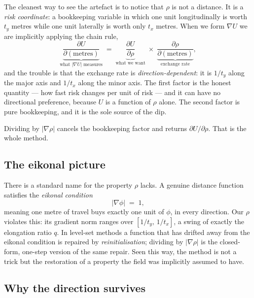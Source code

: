 \documentclass[11pt]{article}
\theoremstyle{remark}
\begin{document}
The cleanest way to see the artefact is to notice that $\rho$ is not a
distance. It is a \emph{risk coordinate}: a bookkeeping variable in which
one unit longitudinally is worth $t_y$ metres while one unit laterally is
worth only $t_x$ metres. When we form $\nabla U$ we are implicitly applying
the chain rule,
\begin{equation}
  \underbrace{\frac{\partial U}{\partial(\text{metres})}}_{\text{what }|\nabla U|\text{ measures}}
  \;=\;
  \underbrace{\frac{\partial U}{\partial\rho}}_{\text{what we want}}
  \;\times\;
  \underbrace{\frac{\partial\rho}{\partial(\text{metres})}}_{\text{exchange rate}} ,
\end{equation}
and the trouble is that the exchange rate is \emph{direction-dependent}: it
is $1/t_y$ along the major axis and $1/t_x$ along the minor axis. The first
factor is the honest quantity --- how fast risk changes per unit of risk ---
and it can have no directional preference, because $U$ is a function of
$\rho$ alone. The second factor is pure bookkeeping, and it is the sole
source of the dip.

Dividing by $|\nabla\rho|$ cancels the bookkeeping factor and returns
$\partial U/\partial\rho$. That is the whole method.

\subsection{The eikonal picture}

There is a standard name for the property $\rho$ lacks. A genuine distance
function satisfies the \emph{eikonal condition}
\begin{equation}
  \bigl|\nabla\phi\bigr| \;=\; 1 ,
\end{equation}
meaning one metre of travel buys exactly one unit of $\phi$, in every
direction. Our $\rho$ violates this: its gradient norm ranges over
$[1/t_y,\,1/t_x]$, a swing of exactly the elongation ratio $q$. In level-set
methods a function that has drifted away from the eikonal condition is
repaired by \emph{reinitialisation}; dividing by $|\nabla\rho|$ is the
closed-form, one-step version of the same repair. Seen this way, the method
is not a trick but the restoration of a property the field was implicitly
assumed to have.

\subsection{Why the direction survives}
\end{document}
